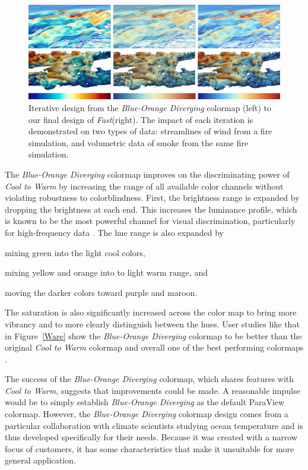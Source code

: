 \documentclass{IEEEcsmag}
\newcommand*{\colormap}[1]{\textsl{#1}\xspace}
\newcommand*{\coolwarm}{\colormap{Cool to Warm}}
\newcommand*{\blueorange}{\colormap{Blue-Orange Diverging}}
\newcommand*{\fast}{\colormap{Fast}}
\begin{document}
\begin{figure}[t]
  \centering
  \includegraphics[width=\textwidth]{Final_Pics/Compare22.png}
  \caption{
    Iterative design from the \blueorange colormap (left) to our final design of \fast (right).
    The impact of each iteration is demonstrated on two types of data: streamlines of wind from a fire simulation, and volumetric data of smoke from the same fire simulation.}
\label{fig:iterations}
\end{figure}


The \blueorange colormap improves on the discriminating power of \coolwarm by increasing the range of all available color channels without violating robustness to colorblindness.
First, the brightness range is expanded by dropping the brightness at each end.
This increases the luminance profile, which is known to be the most powerful channel for visual discrimination, particularly for high-frequency data \cite{Ware2019}.
The hue range is also expanded by
\begin{inparaenum}[(1)]
\item mixing green into the light cool colors,
\item mixing yellow and orange into to light warm range, and
\item moving the darker colors toward purple and maroon.
\end{inparaenum}
The saturation is also significantly increased across the color map to bring more vibrancy and to more clearly distinguish between the hues.
User studies like that in Figure~\ref{Ware}
show the \blueorange colormap to be better than the original \coolwarm colormap and overall one of the best performing colormaps \cite{Ware2017,Ware2019,Turton2017}.



The success of the \blueorange colormap, which shares features with \coolwarm, suggests that improvements could be made.
A reasonable impulse would be to simply establish \blueorange as the default ParaView colormap.
However, the \blueorange colormap design comes from a particular collaboration with climate scientists studying ocean temperature and is thus developed specifically for their needs.
Because it was created with a narrow focus of customers, it has some characteristics that make it unsuitable for more general application.
\end{document}
